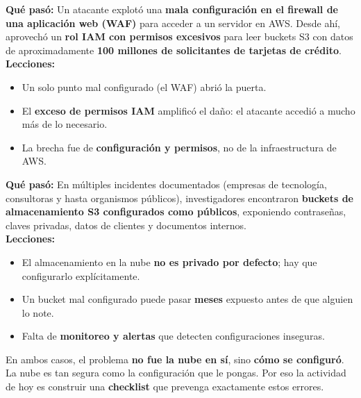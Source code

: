 \documentclass[12pt,a4paper]{article}
\begin{document}
\begin{cajaCaso}[title={Caso 1: Capital One (2019) --- 100 millones de registros}]
\textbf{Qu\'e pas\'o:} Un atacante explot\'o una \textbf{mala configuraci\'on en el firewall de una aplicaci\'on web (WAF)} para acceder a un servidor en AWS. Desde ah\'i, aprovech\'o un \textbf{rol IAM con permisos excesivos} para leer buckets S3 con datos de aproximadamente \textbf{100 millones de solicitantes de tarjetas de cr\'edito}.\\[4pt]
\textbf{Lecciones:}
\begin{itemize}[leftmargin=1.5em]
    \item Un solo punto mal configurado (el WAF) abri\'o la puerta.
    \item El \textbf{exceso de permisos IAM} amplific\'o el da\~no: el atacante accedi\'o a mucho m\'as de lo necesario.
    \item La brecha fue de \textbf{configuraci\'on y permisos}, no de la infraestructura de AWS.
\end{itemize}
\end{cajaCaso}

\begin{cajaCaso}[title={Caso 2: Buckets S3 p\'ublicos (patr\'on recurrente)}]
\textbf{Qu\'e pas\'o:} En m\'ultiples incidentes documentados (empresas de tecnolog\'ia, consultoras y hasta organismos p\'ublicos), investigadores encontraron \textbf{buckets de almacenamiento S3 configurados como p\'ublicos}, exponiendo contrase\~nas, claves privadas, datos de clientes y documentos internos.\\[4pt]
\textbf{Lecciones:}
\begin{itemize}[leftmargin=1.5em]
    \item El almacenamiento en la nube \textbf{no es privado por defecto}; hay que configurarlo expl\'icitamente.
    \item Un bucket mal configurado puede pasar \textbf{meses} expuesto antes de que alguien lo note.
    \item Falta de \textbf{monitoreo y alertas} que detecten configuraciones inseguras.
\end{itemize}
\end{cajaCaso}

\begin{cajaConcepto}[title={El patr\'on com\'un}]
En ambos casos, el problema \textbf{no fue la nube en s\'i}, sino \textbf{c\'omo se configur\'o}. La nube es tan segura como la configuraci\'on que le pongas. Por eso la actividad de hoy es construir una \textbf{checklist} que prevenga exactamente estos errores.
\end{cajaConcepto}
\end{document}
